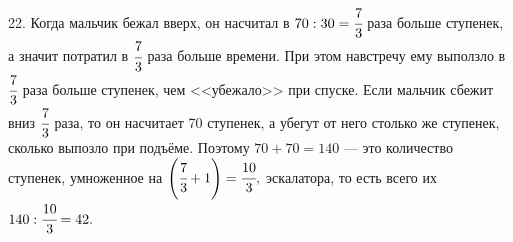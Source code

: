 22. Когда мальчик бежал вверх, он насчитал в $70:30=\cfrac{7}{3}$ раза больше ступенек, а значит потратил в $\cfrac{7}{3}$ раза больше времени. При этом навстречу ему выползло в $\cfrac{7}{3}$ раза больше ступенек, чем <<убежало>> при спуске. Если мальчик сбежит вниз $\cfrac{7}{3}$ раза, то он насчитает 70 ступенек, а убегут от него столько же ступенек, сколько выпозло при подъёме. Поэтому $70+70=140$ --- это количество ступенек, умноженное на $\left(\cfrac{7}{3}+1\right)=\cfrac{10}{3},$ эскалатора, то есть всего их $140:\cfrac{10}{3}=42.$\\
